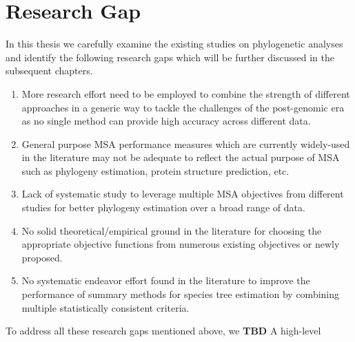 \section{Research Gap}
In this thesis we carefully examine the existing studies on phylogenetic analyses and identify the following research gaps which will be further discussed in the subsequent chapters.
\begin{enumerate}
	\item  More research effort need to be employed to combine the strength of different approaches in a generic way to tackle the challenges of the post-genomic era as no single method can provide high accuracy across different data. 
	
	
	\item  General purpose MSA performance measures which are currently widely-used in the literature may not be adequate to reflect the actual purpose of MSA such as phylogeny estimation, protein structure prediction, etc.
	
	
	\item  Lack of systematic study to leverage multiple MSA objectives from different studies for better phylogeny estimation over a broad range of data.
	
	
	\item  No solid theoretical/empirical ground in the literature for choosing the appropriate objective functions from numerous existing objectives  or newly proposed.
	
	
	\item No systematic endeavor effort found in the literature to improve the performance of summary methods for species tree estimation by combining multiple statistically consistent criteria.
\end{enumerate}

To address all these research gaps mentioned above, we \textbf{TBD}
A high-level

